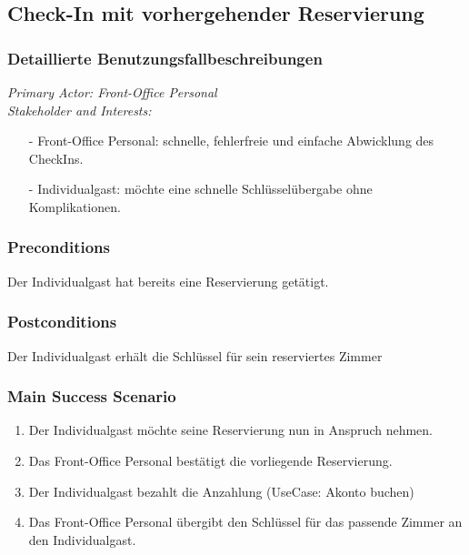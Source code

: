 \documentclass[./detailed_overview_usecases.tex]{subfiles}
\begin{document}
    \subsection{Check-In mit vorhergehender Reservierung}
    \subsubsection{Detaillierte Benutzungsfallbeschreibungen}
    \textit{Primary Actor: Front-Office Personal}
    \\
    \textit{Stakeholder and Interests:}
    \begin{itemize}
        \item[-] Front-Office Personal: schnelle, fehlerfreie und einfache Abwicklung des CheckIns.
        \item[-] Individualgast: möchte eine schnelle Schlüsselübergabe ohne Komplikationen.
    \end{itemize}

    \subsubsection*{Preconditions}
    Der Individualgast hat bereits eine Reservierung getätigt.
    \subsubsection*{Postconditions}
    Der Individualgast erhält die Schlüssel für sein reserviertes Zimmer

    \subsubsection*{Main Success Scenario}
    \begin{enumerate}
        \item Der Individualgast möchte seine Reservierung nun in Anspruch nehmen.
        \item Das Front-Office Personal bestätigt die vorliegende Reservierung.
        \item Der Individualgast bezahlt die Anzahlung (UseCase: Akonto buchen)
        \item Das Front-Office Personal übergibt den Schlüssel für das passende Zimmer an den Individualgast.
    \end{enumerate}
\end{document}
